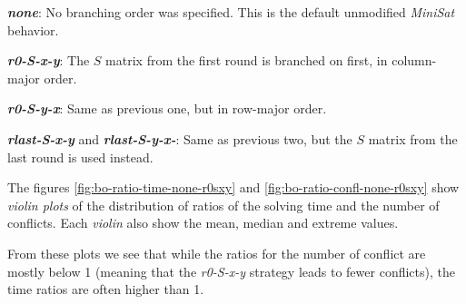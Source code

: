 \textbf{\emph{none}}: No branching order was specified. This is the default unmodified \emph{MiniSat} behavior.

\textbf{\emph{r0-S-x-y}}: The $S$ matrix from the first round is branched on first, in column-major order.

\textbf{\emph{r0-S-y-x}}: Same as previous one, but in row-major order.

\textbf{\emph{rlast-S-x-y}} and \textbf{\emph{rlast-S-y-x-}}: Same as previous two, but the $S$ matrix from the last round is used instead.	

The figures \ref{fig:bo-ratio-time-none-r0sxy} and \ref{fig:bo-ratio-confl-none-r0sxy} show \emph{violin plots} of the distribution of ratios of the solving time and the number of conflicts.
Each \emph{violin} also show the mean, median and extreme values.

From these plots we see that while the ratios for the number of conflict are mostly below 1 (meaning that the \emph{r0-S-x-y} strategy leads to fewer conflicts), the time ratios are often higher than 1.

